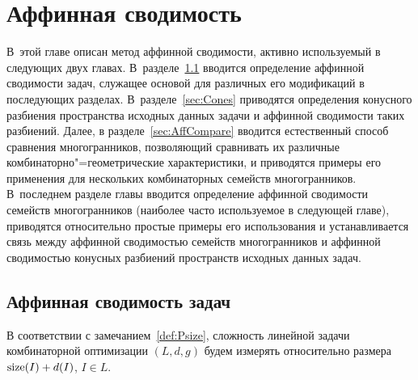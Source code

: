 
%
%
\chapter{Аффинная сводимость}
\label{chap:AffTheory}

В~этой главе описан метод аффинной сводимости, активно используемый в следующих двух главах.
В~разделе~\ref{sec:AffProblems} вводится определение аффинной сводимости задач, служащее основой для различных его модификаций в последующих разделах.
В~разделе~\ref{sec:Cones} приводятся определения конусного разбиения пространства исходных данных задачи и аффинной сводимости таких разбиений.
Далее, в разделе~\ref{sec:AffCompare} вводится естественный способ сравнения многогранников, позволяющий сравнивать их различные комбинаторно"=геометрические характеристики, и приводятся примеры его применения для нескольких комбинаторных семейств многогранников.
В~последнем разделе главы вводится определение аффинной сводимости семейств многогранников (наиболее часто используемое в следующей главе), приводятся относительно простые примеры его использования и устанавливается связь между аффинной сводимостью семейств многогранников и аффинной сводимостью конусных разбиений пространств исходных данных задач. 

\section{Аффинная сводимость задач}
\label{sec:AffProblems}

В соответствии с замечанием~\ref{def:Psize}, сложность линейной задачи комбинаторной оптимизации $(L,d,g)$ будем измерять относительно размера $\operatorname{size}(I) + d(I)$, $I \in L$.

